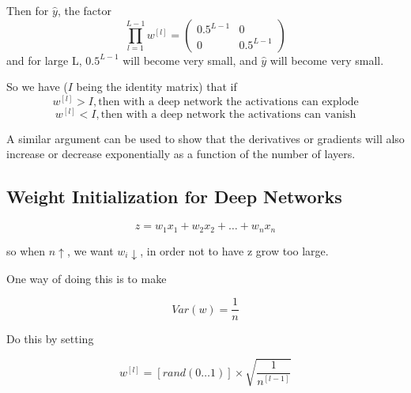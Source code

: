 Then for $\hat{y}$, the factor
\[
    \prod_{l=1}^{L-1}w^{[l]} = 
    \begin{pmatrix}
        0.5^{L-1} & 0 \\
        0 & 0.5^{L-1} 
    \end{pmatrix}
\]
and for large L, $0.5^{L-1}$ will become very small, and $\hat{y}$ will become very small.

So we have ($I$ being the identity matrix) that if
\[ w^{[l]} > I, \text{then with a deep network the activations can explode} \]
\[ w^{[l]} < I, \text{then with a deep network the activations can vanish} \]

A similar argument can be used to show that the derivatives or gradients will also increase 
or decrease exponentially as a function of the number of layers.


\subsection*{Weight Initialization for Deep Networks}



\[ z = w_1 x_1 + w_2 x_2 + \ldots + w_n x_n \]

so when $n \uparrow$, we want $w_i \downarrow$, in order not to have z grow too large.

One way of doing this is to make

\[ Var(w)= \frac{1}{n} \]

Do this by setting

\[ 
    w^{[l]} = 
    [rand(0 \ldots 1)] \times \sqrt{\frac{1}{n^{[l-1]}}} 
\]

